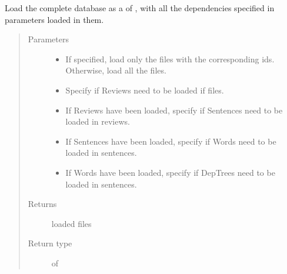 \documentclass[letterpaper,10pt,english]{sphinxmanual}
\begin{document}

\begin{fulllineitems}
\label{\detokenize{load:loacore.load.file_load.load_database}}
Load the complete database as a  of {\hyperref[\detokenize{classes:loacore.classes.classes.File}]{}} , with all the dependencies specified in parameters
loaded in them.
\begin{quote}\begin{description}
\item[{Parameters}] \leavevmode\begin{itemize}
\item {} 
 \textendash{} If specified, load only the files with the corresponding ids. Otherwise, load all the files.

\item {} 
 \textendash{} Specify if Reviews need to be loaded if files.

\item {} 
 \textendash{} If Reviews have been loaded, specify if Sentences need to be loaded in reviews.

\item {} 
 \textendash{} If Sentences have been loaded, specify if Words need to be loaded in sentences.

\item {} 
 \textendash{} If Words have been loaded, specify if DepTrees need to be loaded in sentences.

\end{itemize}

\item[{Returns}] \leavevmode
loaded files

\item[{Return type}] \leavevmode
{} of {\hyperref[\detokenize{classes:loacore.classes.classes.File}]{}}


\end{description}
\end{quote}
\end{fulllineitems}
\end{document}
